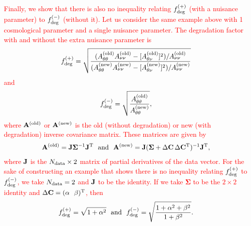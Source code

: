 \documentclass[usenatbib]{mnras}
\newcommand{\changetext}[1]{\textcolor{red}{#1}}
\begin{document}
\changetext{Finally, we show that there is also no inequality relating $f_{\rm deg}^{(+)}$ (with a nuisance parameter) to $f_{\rm deg}^{(-)}$ (without it). Let us consider the same example above with 1 cosmological parameter and a single nuisance parameter. The degradation factor with and without the extra nuisance parameter is
\begin{equation}
f_{\rm deg}^{(+)} = \sqrt{ \frac{
(A_{\theta\theta}^{\rm(old)} A_{\nu\nu}^{\rm(old)} - [A_{\theta\nu}^{\rm(old)}]^2)/A_{\nu\nu}^{\rm(old)}
}{
(A_{\theta\theta}^{\rm(new)} A_{\nu\nu}^{\rm(new)} - [A_{\theta\nu}^{\rm(new)}]^2)/A_{\nu\nu}^{\rm(new)}
}}
\end{equation}
and
\begin{equation}
f_{\rm deg}^{(-)} = \sqrt{ \frac{A_{\theta\theta}^{\rm(old)}}{A_{\theta\theta}^{\rm(new)}} },
\end{equation}
where ${\bf A}^{\rm(old)}$ or ${\bf A}^{\rm(new)}$ is the old (without degradation) or new (with degradation) inverse covariance matrix. These matrices are given by
\begin{equation}
{\bf A}^{\rm(old)} = {\bf J}{\boldsymbol\Sigma}^{-1}{\bf J}^{\rm T}
~~{\rm and}~~
{\bf A}^{\rm(new)} = {\bf J}({\boldsymbol\Sigma} + \Delta{\bf C}\,\Delta{\bf C}^{\rm T})^{-1}{\bf J}^{\rm T},
\end{equation}
where ${\bf J}$ is the $N_{\rm data}\times 2$ matrix of partial derivatives of the data vector. For the sake of constructing an example that shows there is no inequality relating $f_{\rm deg}^{(+)}$ to $f_{\rm deg}^{(-)}$, we take $N_{\rm data}=2$ and ${\bf J}$ to be the identity. If we take ${\boldsymbol\Sigma}$ to be the $2\times 2$ identity and $\Delta{\bf C} = (\alpha~~\beta)^{\rm T}$, then
\begin{equation}
f_{\rm deg}^{(+)} = \sqrt{1+\alpha^2} ~~{\rm and}~~ f_{\rm deg}^{(-)} = \sqrt{\frac{1+\alpha^2+\beta^2}{1+\beta^2}}.
\end{equation}
}
\end{document}
